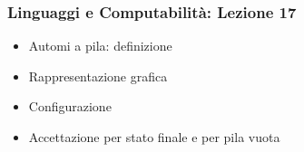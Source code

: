 




\begin{frame}[fragile]
        \frametitle{Linguaggi e Computabilità: Lezione 17}
\begin{itemize}
\item
      Automi a pila: definizione
\item
      Rappresentazione grafica
\item
      Configurazione
\item
      Accettazione per stato finale e per pila vuota
\end{itemize}
\end{frame}








